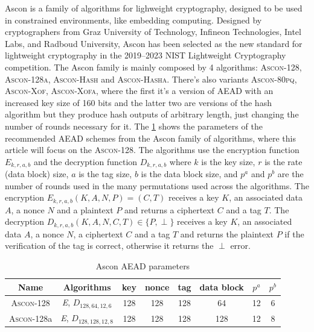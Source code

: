 \documentclass[11pt,twoside]{article}
\begin{document}
Ascon is a family of algorithms for lighweight cryptography, designed to be used in constrained environments,
like embedding computing. Designed by cryptographers from Graz University of Technology, Infineon Technologies, Intel Labs, and Radboud University, Ascon has been selected as the new standard for lightweight cryptography in the 2019–2023 NIST Lightweight Cryptography competition. The Ascon family is mainly composed by 4 algorithms: \textsc{Ascon-128}, \textsc{Ascon-128a}, \textsc{Ascon-Hash} and \textsc{Ascon-Hasha}. There's also variants \textsc{Ascon-80pq}, \textsc{Ascon-Xof}, \textsc{Ascon-Xofa}, where the first it's a version of AEAD with an increased key size of 160 bits and the latter two are versions of the hash algorithm but they produce hash outputs of arbitrary
length, just changing the number of rounds necessary for it. The \cref{table:1} shows the parameters of the recommended AEAD schemes from the Ascon family of algorithms, where this article will focus on the \textsc{Ascon-128}. The algorithms use the encryption function $\textit{E}_{k,r,a,b}$ and the decryption function $\textit{D}_{k,r,a,b}$ where $k$ is the key size, $r$ is the rate (data block) size, $a$ is the tag size, $b$ is the data block size, and $p^a$ and $p^b$ are the number of rounds used in the many permutations used across the algorithms. The encryption $\textit{E}_{k,r,a,b}(K, A, N, P) = (C, T)$ receives a key $K$, an associated data $A$, a nonce $N$ and a plaintext $P$ and returns a ciphertext $C$ and a tag $T$. The decryption $\textit{D}_{k,r,a,b}(K, A, N, C, T) \in \{P, \perp\}$ receives a key $K$, an associated data $A$, a nonce $N$, a ciphertext $C$ and a tag $T$ and returns the plaintext $P$ if the verification of the tag is correct, otherwise it returns the $\perp$ error.


\begin{table}
  \centering
  \begin{tabular}{|c|c|cccc|cc|}
    \hline
    \textbf{Name}       & \textbf{Algorithms}                     & \textbf{key} & \textbf{nonce} & \textbf{tag} & \textbf{data block} & \textbf{$p^a$} & \textbf{$p^b$} \\ \hline
    \textsc{Ascon-128}  & \textit{E}, $\textit{D}_{128,64,12,6}$  & 128          & 128            & 128          & 64                  & 12             & 6              \\ \hline
    \textsc{Ascon-128}a & \textit{E}, $\textit{D}_{128,128,12,8}$ & 128          & 128            & 128          & 128                 & 12             & 8              \\ \hline
  \end{tabular}
  \caption{Ascon AEAD parameters}
  \label{table:1}
\end{table}
\end{document}
